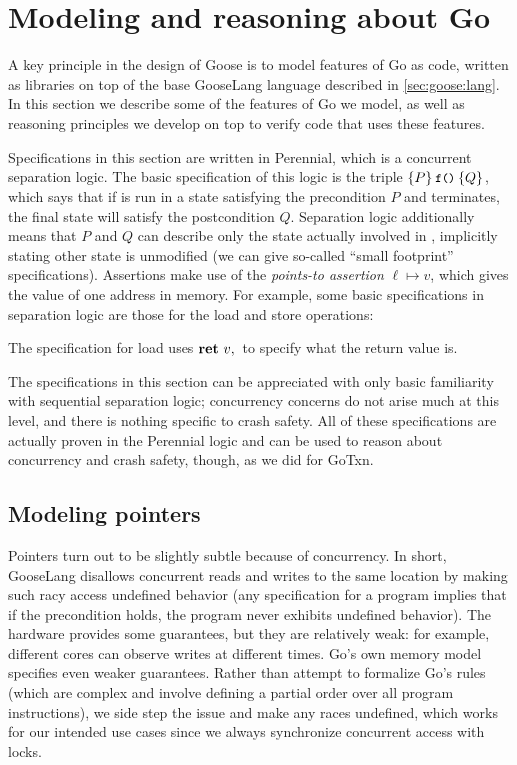 \section{Modeling and reasoning about Go}%
\label{sec:goose:reasoning}

A key principle in the design of Goose is to model features of Go as code,
written as libraries on top of the base GooseLang language described in
\autoref{sec:goose:lang}. In this section we describe some of the features of Go
we model, as well as reasoning principles we develop on top to verify code that
uses these features.

Specifications in this section are written in Perennial, which is a concurrent
separation logic. The basic specification of this logic is the triple
$\hoare{P}{\cc{f()}}{Q}$, which says that if  is run in a state
satisfying the precondition $P$ and terminates, the final state will satisfy the
postcondition $Q$. Separation logic additionally means that $P$ and $Q$ can
describe only the state actually involved in , implicitly stating other
state is unmodified (we can give so-called ``small footprint'' specifications).
Assertions make use of the \emph{points-to assertion} $\ell \mapsto v$, which
gives the value of one address in memory. For example, some basic specifications
in separation logic are those for the load and store operations:
%
\begin{mathpar}

\end{mathpar}

The specification for load uses $\Ret{v}$ to specify what the return value is.

The specifications in this section can be appreciated with only basic
familiarity with sequential separation logic; concurrency concerns do not arise
much at this level, and there is nothing specific to crash safety. All of these
specifications are actually proven in the Perennial logic and can be used to
reason about concurrency and crash safety, though, as we did for GoTxn.

\subsection{Modeling pointers}%
\label{sec:goose:pointers}

Pointers turn out to be slightly subtle because of concurrency. In
short, GooseLang disallows concurrent reads and writes to the same
location by making such racy access undefined behavior (any
specification for a program implies that if the precondition holds, the
program never exhibits undefined behavior). The hardware provides some
guarantees, but they are relatively weak: for example, different cores
can observe writes at different times. Go's own memory model specifies
even weaker guarantees. Rather than attempt to formalize Go's rules
(which are complex and involve defining a partial order over all program
instructions), we side step the issue and make any races undefined,
which works for our intended use cases since we always synchronize
concurrent access with locks.

